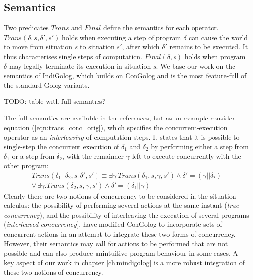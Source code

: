 \subsection{Semantics}

Two predicates $Trans$ and $Final$ define the semantics for each
operator. $Trans(\delta,s,\delta',s')$ holds when executing a step
of program $\delta$ can cause the world to move from situation $s$
to situation $s'$, after which $\delta'$ remains to be executed.
It thus characterises single steps of computation. $Final(\delta,s)$
holds when program $\delta$ may legally terminate its execution in
situation $s$. We base our work on the semantics of IndiGolog, which
builds on ConGolog and is the most feature-full of the standard Golog
variants.

TODO: table with full semantics?

The full semantics are available in the references, but as an example
consider equation (\ref{eqn:trans_conc_orig}), which specifies the
concurrent-execution operator as an \emph{interleaving} of computation
steps. It states that it is possible to single-step the concurrent
execution of $\delta_{1}$ and $\delta_{2}$ by performing either
a step from $\delta_{1}$ or a step from $\delta_{2}$, with the remainder
$\gamma$ left to execute concurrently with the other program:\begin{multline}
Trans(\delta_{1}||\delta_{2},s,\delta',s')\equiv\exists\gamma.Trans(\delta_{1},s,\gamma,s')\wedge\delta'=(\gamma||\delta_{2})\\
\vee\,\exists\gamma.Trans(\delta_{2},s,\gamma,s')\wedge\delta'=(\delta_{1}||\gamma)\label{eqn:Background:trans_conc_orig}\end{multline}
 Clearly there are two notions of concurrency to be considered in
the situation calculus: the possibility of performing several actions
at the same instant (\emph{true concurrency}), and the possibility
of interleaving the execution of several programs (\emph{interleaved
concurrency}). \citet{pinto99tcongolog} have modified ConGolog to
incorporate sets of concurrent actions in an attempt to integrate
these two forms of concurrency. However, their semantics may call
for actions to be performed that are not possible and can also produce
unintuitive program behaviour in some cases. A key aspect of our work
in chapter \ref{ch:mindigolog} is a more robust integration of these
two notions of concurrency.

